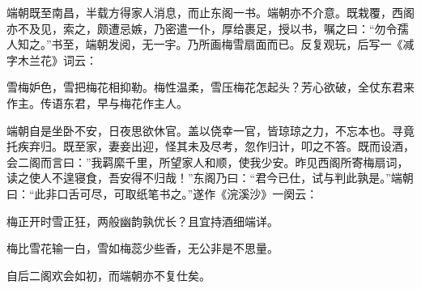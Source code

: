 \documentclass[a4paper,12pt,UTF8,twoside]{ctexbook}
\begin{document}
端朝既至南昌，半载方得家人消息，而止东阁一书。端朝亦不介意。既栽覆，西阁亦不及见，索之，颇遭忌嫉，乃密遣一仆，厚给裹足，授以书，嘱之曰：“勿令孺人知之。”书至，端朝发阅，无一宇。乃所画梅雪扇面而已。反复观玩，后写一《减字木兰花》词云：

雪梅妒色，雪把梅花相抑勒。梅性温柔，雪压梅花怎起头？芳心欲破，全仗东君来作主。传语东君，早与梅花作主人。

端朝自是坐卧不安，日夜思欲休官。盖以侥幸一官，皆琼琼之力，不忘本也。寻竟托疾弃归。既至家，妻妾出迎，怪其未及尽考，忽作归计，叩之不答。既而设酒，会二阁而言曰：”我羁縻千里，所望家人和顺，使我少安。昨见西阁所寄梅扇词，读之使人不遑寝食，吾安得不归哉！”东阁乃曰：“君今已仕，试与判此孰是。”端朝曰：“此非口舌可尽，可取纸笔书之。”遂作《浣溪沙》一阕云：

梅正开时雪正狂，两般幽韵孰优长？且宜持酒细端详。

梅比雪花输一白，雪如梅蕊少些香，无公非是不思量。

自后二阁欢会如初，而端朝亦不复仕矣。
\end{document}
